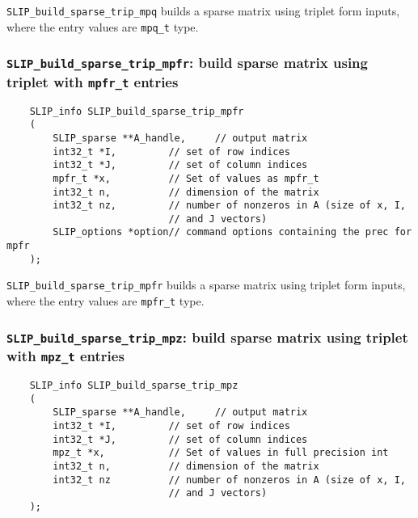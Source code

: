 \documentclass[12pt]{article}
\theoremstyle{definition}
\begin{document}
\verb|SLIP_build_sparse_trip_mpq| builds a sparse matrix using triplet form
inputs, where the entry values are \verb|mpq_t| type.

\cprotect\subsubsection{\verb|SLIP_build_sparse_trip_mpfr|: build sparse matrix using triplet with \verb|mpfr_t| entries}
\label{s:user:build_sparse_trip_mpfr}

\begin{mdframed}[userdefinedwidth=6in]
{\footnotesize
\begin{verbatim}
    SLIP_info SLIP_build_sparse_trip_mpfr
    (
        SLIP_sparse **A_handle,     // output matrix
        int32_t *I,         // set of row indices
        int32_t *J,         // set of column indices
        mpfr_t *x,          // Set of values as mpfr_t
        int32_t n,          // dimension of the matrix
        int32_t nz,         // number of nonzeros in A (size of x, I,
                            // and J vectors)
        SLIP_options *option// command options containing the prec for mpfr
    );
\end{verbatim}
} \end{mdframed}

\verb|SLIP_build_sparse_trip_mpfr| builds a sparse matrix using triplet form
inputs, where the entry values are \verb|mpfr_t| type.

\cprotect\subsubsection{\verb|SLIP_build_sparse_trip_mpz|: build sparse matrix using triplet with \verb|mpz_t| entries}
\label{s:user:build_sparse_trip_mpz}

\begin{mdframed}[userdefinedwidth=6in]
{\footnotesize
\begin{verbatim}
    SLIP_info SLIP_build_sparse_trip_mpz
    (
        SLIP_sparse **A_handle,     // output matrix
        int32_t *I,         // set of row indices
        int32_t *J,         // set of column indices
        mpz_t *x,           // Set of values in full precision int
        int32_t n,          // dimension of the matrix
        int32_t nz          // number of nonzeros in A (size of x, I,
                            // and J vectors)
    );
\end{verbatim}
} \end{mdframed}
\end{document}
